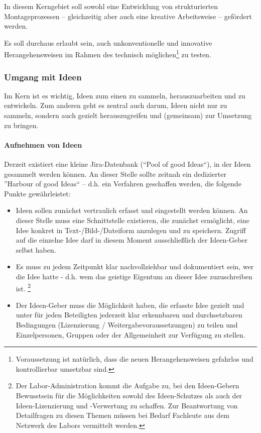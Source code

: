 \documentclass[parskip=half,headsepline,footsepline,titlepage]{scrartcl}
\begin{document}
In diesem Kerngebiet soll sowohl eine Entwicklung von strukturierten Montageprozessen -- gleichzeitig aber auch eine kreative Arbeitsweise -- gefördert werden.

Es soll durchaus erlaubt sein, auch unkonventionelle und innovative Herangehensweisen im Rahmen des technisch möglichen\footnote{Voraussetzung ist natürlich, dass die neuen Herangehensweisen gefahrlos und kontrollierbar umsetzbar sind.} zu testen.

\subsubsection{Umgang mit Ideen}
Im Kern ist es wichtig, Ideen zum einen zu sammeln, herauszuarbeiten und zu entwickeln. Zum anderen geht es zentral auch darum, Ideen nicht nur zu sammeln, sondern auch gezielt herauszugreifen und (gemeinsam) zur Umsetzung zu bringen.

\paragraph{Aufnehmen von Ideen}
Derzeit existiert eine kleine Jira-Datenbank (``Pool of good Ideas``), in der Ideen gesammelt werden können. An dieser Stelle sollte zeitnah ein dedizierter ''Harbour of good Ideas`` -- d.h. ein Verfahren geschaffen werden, die folgende Punkte gewährleistet:

\begin{itemize}
 \item Ideen sollen zunächst vertraulich erfasst und eingestellt werden können. An dieser Stelle muss eine Schnittstelle existieren, die zunächst ermöglicht, eine Idee konkret in Text-/Bild-/Dateiform anzulegen und zu speichern. Zugriff auf die einzelne Idee darf in diesem Moment ausschließlich der Ideen-Geber selbst haben.
 \item Es muss zu jedem Zeitpunkt klar nachvollziehbar und dokumentiert sein, wer die Idee hatte - d.h. wem das geistige Eigentum an dieser Idee zuzuschreiben ist. \footnote{Der Labor-Administration kommt die Aufgabe zu, bei den Ideen-Gebern Bewusstsein für die Möglichkeiten sowohl des Ideen-Schutzes als auch der Ideen-Lizenzierung und -Verwertung zu schaffen. Zur Beantwortung von Detailfragen zu diesen Themen müssen bei Bedarf Fachleute aus dem Netzwerk des Labors vermittelt werden.}
 \item Der Ideen-Geber muss die Möglichkeit haben, die erfasste Idee gezielt und unter für jeden Beteiligten jederzeit klar erkennbaren und durchsetzbaren Bedingungen (Lizenzierung / Weitergabevoraussetzungen) zu teilen und Einzelpersonen, Gruppen oder der Allgemeinheit zur Verfügung zu stellen.
 
\end{itemize}
\end{document}
